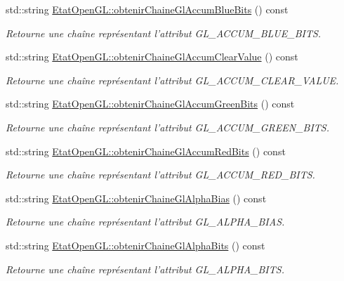 \begin{DoxyCompactItemize}
std\-::string \hyperlink{group__utilitaire_ga695387ee2d838c97214c70219d52da10}{Etat\-Open\-G\-L\-::obtenir\-Chaine\-Gl\-Accum\-Blue\-Bits} () const 
\begin{DoxyCompactList}\small\item\em Retourne une chaîne représentant l'attribut G\-L\-\_\-\-A\-C\-C\-U\-M\-\_\-\-B\-L\-U\-E\-\_\-\-B\-I\-T\-S. \end{DoxyCompactList}\item 
std\-::string \hyperlink{group__utilitaire_gaf3e85f5f434e93aa09376200f3c837ae}{Etat\-Open\-G\-L\-::obtenir\-Chaine\-Gl\-Accum\-Clear\-Value} () const 
\begin{DoxyCompactList}\small\item\em Retourne une chaîne représentant l'attribut G\-L\-\_\-\-A\-C\-C\-U\-M\-\_\-\-C\-L\-E\-A\-R\-\_\-\-V\-A\-L\-U\-E. \end{DoxyCompactList}\item 
std\-::string \hyperlink{group__utilitaire_gae677b60d2113b1843ba4d2c92fe34c34}{Etat\-Open\-G\-L\-::obtenir\-Chaine\-Gl\-Accum\-Green\-Bits} () const 
\begin{DoxyCompactList}\small\item\em Retourne une chaîne représentant l'attribut G\-L\-\_\-\-A\-C\-C\-U\-M\-\_\-\-G\-R\-E\-E\-N\-\_\-\-B\-I\-T\-S. \end{DoxyCompactList}\item 
std\-::string \hyperlink{group__utilitaire_ga3405a98de14c30d7a57d954d298b6376}{Etat\-Open\-G\-L\-::obtenir\-Chaine\-Gl\-Accum\-Red\-Bits} () const 
\begin{DoxyCompactList}\small\item\em Retourne une chaîne représentant l'attribut G\-L\-\_\-\-A\-C\-C\-U\-M\-\_\-\-R\-E\-D\-\_\-\-B\-I\-T\-S. \end{DoxyCompactList}\item 
std\-::string \hyperlink{group__utilitaire_gaf54d9525863334d2d2fd362c7043a4be}{Etat\-Open\-G\-L\-::obtenir\-Chaine\-Gl\-Alpha\-Bias} () const 
\begin{DoxyCompactList}\small\item\em Retourne une chaîne représentant l'attribut G\-L\-\_\-\-A\-L\-P\-H\-A\-\_\-\-B\-I\-A\-S. \end{DoxyCompactList}\item 
std\-::string \hyperlink{group__utilitaire_ga7ea311e8cfd6aee3cb19e2041b2ba132}{Etat\-Open\-G\-L\-::obtenir\-Chaine\-Gl\-Alpha\-Bits} () const 
\begin{DoxyCompactList}\small\item\em Retourne une chaîne représentant l'attribut G\-L\-\_\-\-A\-L\-P\-H\-A\-\_\-\-B\-I\-T\-S. \end{DoxyCompactList}\item 

\end{DoxyCompactItemize}
